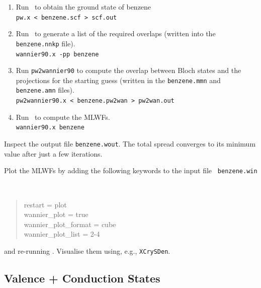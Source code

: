 \documentclass[a4paper,11pt,twoside]{article}
\begin{document}
\begin{enumerate}
\item Run \pwscf\ to obtain the ground state of benzene\\
{\tt pw.x < benzene.scf > scf.out}

\item Run \wannier\ to generate a list of the required overlaps (written
  into the {\tt benzene.nnkp} file).\\
{\tt wannier90.x -pp benzene}

\item Run {\tt pw2wannier90} to compute the overlap between Bloch
  states and the projections for the starting guess (written in the
  {\tt benzene.mmn} and {\tt  benzene.amn} files).\\
{\tt pw2wannier90.x < benzene.pw2wan > pw2wan.out}

\item Run \wannier\ to compute the MLWFs.\\
{\tt wannier90.x benzene}

\end{enumerate}

Inspect the output file {\tt benzene.wout}. The total spread converges
to its minimum value after just a few iterations. 

Plot the MLWFs by adding the following keywords to the input file {\tt
  benzene.win} 
{\tt
\begin{quote}
restart               = plot\\
wannier\_plot         = true\\
wannier\_plot\_format = cube\\
wannier\_plot\_list   = 2-4
\end{quote} }
and re-running \wannier. Visualise them using, e.g., {\tt XCrySDen}. 

\subsection*{Valence + Conduction States}
\end{document}
